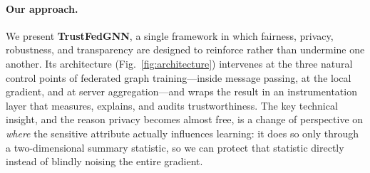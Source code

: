 \documentclass[pdflatex,sn-mathphys-num]{sn-jnl}
\theoremstyle{thmstyleone}%
\theoremstyle{thmstyletwo}%
\theoremstyle{thmstylethree}%
\begin{document}
\paragraph{Our approach.}
We present \textbf{TrustFedGNN}, a single framework in which fairness, privacy,
robustness, and transparency are designed to reinforce rather than undermine one
another. Its architecture (Fig.~\ref{fig:architecture}) intervenes at the three
natural control points of federated graph training---inside message passing, at
the local gradient, and at server aggregation---and wraps the result in an
instrumentation layer that measures, explains, and audits trustworthiness. The
key technical insight, and the reason privacy becomes almost free, is a change
of perspective on \emph{where} the sensitive attribute actually influences
learning: it does so only through a two-dimensional summary statistic, so we can
protect that statistic directly instead of blindly noising the entire gradient.
\end{document}
